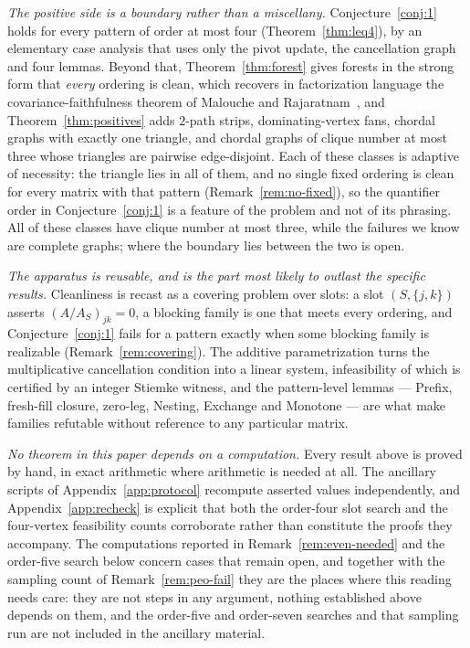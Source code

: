 \documentclass[11pt]{article}
\theoremstyle{plain}
\theoremstyle{definition}
\theoremstyle{remark}
\begin{document}
\begin{humanblock}
\emph{The positive side is a boundary rather than a miscellany.} Conjecture~\ref{conj:1} holds for
every pattern of order at most four (Theorem~\ref{thm:leq4}), by an elementary case analysis that uses
only the pivot update, the cancellation graph and four lemmas. Beyond that, Theorem~\ref{thm:forest}
gives forests in the strong form that \emph{every} ordering is clean, which recovers in factorization
language the covariance-faithfulness theorem of Malouche and Rajaratnam~\cite{Malouche}, and
Theorem~\ref{thm:positives} adds $2$-path strips, dominating-vertex fans, chordal graphs with exactly
one triangle, and chordal graphs of clique number at most three whose triangles are pairwise
edge-disjoint. Each of these classes is adaptive of necessity: the triangle lies in all of them, and no single
fixed ordering is clean for every matrix with that pattern (Remark~\ref{rem:no-fixed}), so the
quantifier order in Conjecture~\ref{conj:1} is a feature of the problem and not of its phrasing. All of
these classes have clique number at most three, while the failures we know are complete graphs; where
the boundary lies between the two is open.

\emph{The apparatus is reusable, and is the part most likely to outlast the specific results.}
Cleanliness is recast as a covering problem over slots: a slot $(S,\{j,k\})$ asserts
$(A/A_S)_{jk}=0$, a blocking family is one that meets every ordering, and
Conjecture~\ref{conj:1} fails for a pattern exactly when some blocking family is realizable
(Remark~\ref{rem:covering}). The additive parametrization turns the multiplicative cancellation
condition into a linear system, infeasibility of which is certified by an integer Stiemke witness, and
the pattern-level lemmas --- Prefix, fresh-fill closure, zero-leg, Nesting, Exchange and Monotone ---
are what make families refutable without reference to any particular matrix.

\emph{No theorem in this paper depends on a computation.} Every result above is proved by hand, in
exact arithmetic where arithmetic is needed at all. The ancillary scripts of
Appendix~\ref{app:protocol} recompute asserted values independently, and
Appendix~\ref{app:recheck} is explicit that both the order-four slot search and the four-vertex
feasibility counts corroborate rather than constitute the proofs they accompany. The computations
reported in Remark~\ref{rem:even-needed} and the order-five search below concern cases that remain
open, and together with the sampling count of Remark~\ref{rem:peo-fail} they are the places where
this reading needs care: they are not steps in any argument, nothing established above depends on
them, and the order-five and order-seven searches and that sampling run are not included in the
ancillary material.


\end{humanblock}
\end{document}
